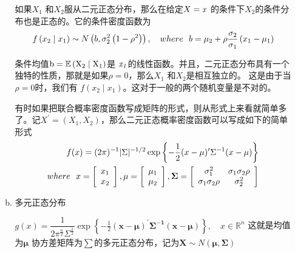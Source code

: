 \begin{enumerate}[ 1) ]
\begin{enumerate}[a)]
       			如果$ X_1 $ 和$ X_2 $服从二元正态分布，那么在给定$ X = \it x $ 的条件下$ X_2 $的条件分布也是正态的。它的条件密度函数为
       			\begin{eqnarray}
					f\left(x_{2} \mid x_{1}\right) \sim N\left(b, \sigma_{2}^{2}\left(1-\rho^{2}\right)\right) ,\quad 
					where \ \ b=\mu_{2}+\rho \frac{\sigma_{2}}{\sigma_{1}} \left(x_{1}-\mu_{1}\right) \notag
       			\end{eqnarray}
       			
       			条件均值$ \rm b =  \mathbb{E} \left(X_{2} \mid X_{1} \right) $是
				   $ \it x_{1} $的线性函数。并且，二元正态分布具有一个独特的性质，那就是如果$ \rho = 0 $，那么$ X_1 $ 和$ X_2 $是相互独立的。
				   这是由于当$ \rho = 0 $时，我们有 $ f\left(x_{2} \mid x_{1}\right) $。这对于一般的两个随机变量是不对的。
       			
       			有时如果把联合概率密度函数写成矩阵的形式，则从形式上来看就简单多了。记$ X^{\prime}=\left(X_{1}, X_{2}\right) $，那么二元正态概率密度函数可以写成如下的简单形式
       			\begin{eqnarray}
					f(x)  =  (2 \pi)^{-1}|\Sigma|^{-1 / 2} 
					 \exp \left\{-\frac{1}{2}(x-\mu)^{\prime} \Sigma^{-1}(x-\mu)\right\} \notag \\
       			where \ \ x=\left[
					   \begin{array}{l}
							x_{1} \\
							x_{2}
	       			   \end{array}\right], \mu=\left[
					   \begin{array}{l}
							\mu_{1} \\
							\mu_{2}
	       			   \end{array}\right], \boldsymbol{\Sigma}=\left[
					   \begin{array}{cc}
							\sigma_{1}^{2} & \sigma_{1} \sigma_{2} \rho \\
							\sigma_{1} \sigma_{2} \rho & \sigma_{2}^{2}
	       			   \end{array}\right] \notag
				   \end{eqnarray}
				   
       			\item 多元正态分布
       			
				   $ g(x)=\dfrac{1}{2 \pi^{\frac{n}{2}} \Sigma^{\frac{1 }{2}} }\exp \left\{-\frac{1}{2} { \boldsymbol{(x-\mu)^{\prime} \Sigma^{-1}(x-\mu)}} \right\}, 
				   \quad x \in \mathbb{R}^{n} $
       			这就是均值为$ \boldsymbol{ \mu }$ 协方差矩阵为$ \sum $的多元正态分布，记为$ \boldsymbol{ X } \sim  N(\boldsymbol{ \mu } , \boldsymbol{ \Sigma }) $
       			

\end{enumerate}
\end{enumerate}
